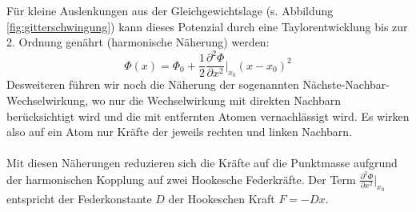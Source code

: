 \documentclass[a4paper,titlepage]{scrartcl}
\numberwithin{equation}{section}
\begin{document}
Für kleine Auslenkungen aus der Gleichgewichtslage (s. Abbildung \ref{fig:gitterschwingung}) kann dieses Potenzial durch eine Taylorentwicklung bis zur 2. Ordnung genährt (harmonische Näherung) werden:
\begin{equation*}
\Phi(x)=\Phi_0+\frac{1}{2} \frac{\partial^2 \Phi}{\partial x^2}\bigg|_{x_0} (x-x_0)^2
\end{equation*}
Desweiteren führen wir noch die Näherung der sogenannten Nächste-Nachbar-Wechselwirkung, wo nur die Wechselwirkung mit direkten Nachbarn berücksichtigt wird und die mit entfernten Atomen vernachlässigt wird. Es wirken also auf ein Atom nur Kräfte der jeweils rechten und linken Nachbarn.\\ \\
Mit diesen Näherungen reduzieren sich die Kräfte auf die Punktmasse aufgrund der harmonischen Kopplung auf zwei Hookesche Federkräfte. Der Term $\frac{\partial^2 \Phi}{\partial x^2}\bigg|_{x_0}$ entspricht der Federkonstante $D$ der Hookeschen Kraft $F=-Dx$.
\end{document}
